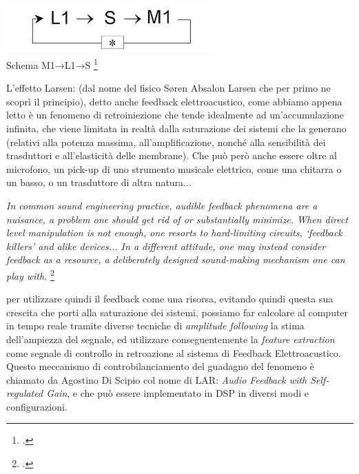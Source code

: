 \begin{center}
\vspace{0.5cm}
\includegraphics[width=8cm]{figures/larsen_feedback_scheme.png} \\
{Schema M1→L1→S \footcite{di_scipio_relational_2022}} \\ 
\vspace{0.5cm}
\end{center}

L'effetto Larsen: (dal nome del fisico Søren Absalon Larsen
che per primo ne scoprì il principio), detto anche feedback elettroacustico,
come abbiamo appena letto è un fenomeno di retroiniezione che tende idealmente 
ad un'accumulazione infinita, che viene limitata in realtà dalla saturazione dei sistemi 
che la generano (relativi alla potenza massima, all'amplificazione, nonché alla sensibilità dei
trasduttori e all'elasticità delle membrane). Che può però anche essere oltre al microfono, un
pick-up di uno strumento musicale elettrico, come una chitarra o un basso, o un trasduttore di
altra natura... 

\begin{center}
\vspace{0.5cm}
\textit{In common sound engineering practice, audible feedback phenomena are a nuisance, a problem one
should get rid of or substantially minimize. When direct level manipulation is not enough, one
resorts to hard-limiting circuits, ‘feedback killers’ and alike devices... 
In a different attitude, one may instead consider feedback as
a resource, a deliberately designed sound-making mechanism one can play with.} \footcite{di_scipio_relational_2022}
\vspace{0.5cm}
\vspace{0.5cm}
\end{center}

per utilizzare quindi il feedback come una
risorsa, evitando quindi questa sua crescita che porti alla saturazione dei sistemi, possiamo far calcolare
al computer in tempo reale tramite diverse tecniche di \textit{amplitude following} la stima dell'ampiezza
del segnale, ed utilizzare conseguentemente la \textit{feature extraction} come segnale di controllo
in retroazione al sistema di Feedback Elettroacustico.
Questo meccanismo di controbilanciamento del guadagno
del fenomeno è chiamato da Agostino Di Scipio col nome di LAR: \textit{Audio Feedback with Self-regulated Gain},
e che può essere implementato in DSP in diversi modi e configurazioni. \\

